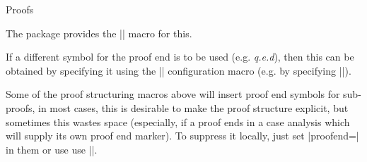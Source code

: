 \begin{sfragment}{Proofs}
\begin{function}{\sproofend}
  The  package provides the |\sproofend| macro for this.
\end{function}
  
\begin{variable}{\sProofEndSymbol}
  If a different symbol for the proof end is to be used (e.g. {\sl{q.e.d}}), then this can
  be obtained by specifying it using the |\sProofEndSymbol| configuration macro (e.g. by
  specifying ||).
\end{variable}
  
Some of the proof structuring macros above will insert proof end symbols for sub-proofs,
in most cases, this is desirable to make the proof structure explicit, but sometimes this
wastes space (especially, if a proof ends in a case analysis which will supply its own
proof end marker). To suppress it locally, just set |proofend={}| in them or use use
|\sProofEndSymbol{}|.
\end{sfragment}


